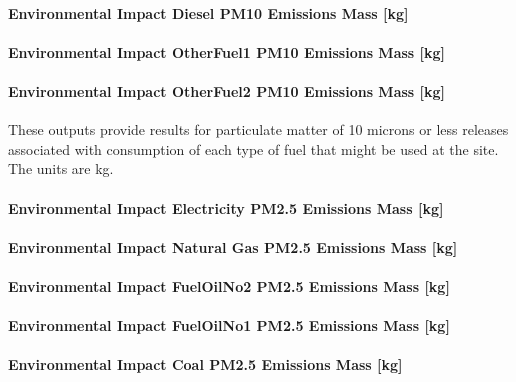 \paragraph{Environmental Impact Diesel PM10 Emissions Mass {[}kg{]}}\label{environmental-impact-diesel-pm10-emissions-mass-kg}

\paragraph{Environmental Impact OtherFuel1 PM10 Emissions Mass {[}kg{]}}\label{environmental-impact-otherfuel1-pm10-emissions-mass-kg}

\paragraph{Environmental Impact OtherFuel2 PM10 Emissions Mass {[}kg{]}}\label{environmental-impact-otherfuel2-pm10-emissions-mass-kg}

These outputs provide results for particulate matter of 10 microns or less releases associated with consumption of each type of fuel that might be used at the site.~ The units are kg.

\paragraph{Environmental Impact Electricity PM2.5 Emissions Mass {[}kg{]}}\label{environmental-impact-electricity-pm2.5-emissions-mass-kg}

\paragraph{Environmental Impact Natural Gas PM2.5 Emissions Mass {[}kg{]}}\label{environmental-impact-natural-gas-pm2.5-emissions-mass-kg}

\paragraph{Environmental Impact FuelOilNo2 PM2.5 Emissions Mass {[}kg{]}}\label{environmental-impact-fuel-oil-2-pm2.5-emissions-mass-kg}

\paragraph{Environmental Impact FuelOilNo1 PM2.5 Emissions Mass {[}kg{]}}\label{environmental-impact-fuel-oil-1-pm2.5-emissions-mass-kg}

\paragraph{Environmental Impact Coal PM2.5 Emissions Mass {[}kg{]}}\label{environmental-impact-coal-pm2.5-emissions-mass-kg}

